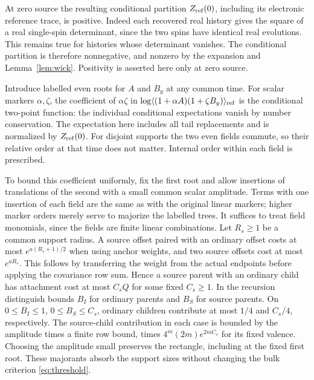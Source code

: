\documentclass[11pt]{article}
\begin{document}
At zero source the resulting conditional partition $Z_{\rm ref}(0)$, including its electronic reference trace, is positive. Indeed each recovered real history gives the square of a real single-spin determinant, since the two spins have identical real evolutions. This remains true for histories whose determinant vanishes. The conditional partition is therefore nonnegative, and nonzero by the expansion and Lemma~\ref{lem:wick}. Positivity is asserted here only at zero source.

Introduce labelled even roots for $A$ and $B_y$ at any common time. For scalar markers $\alpha,\zeta$, the coefficient of $\alpha\zeta$ in $\log\langle(1+\alpha A)(1+\zeta B_y)\rangle_{\rm ref}$ is the conditional two-point function: the individual conditional expectations vanish by number conservation. The expectation here includes all tail replacements and is normalized by $Z_{\rm ref}(0)$. For disjoint supports the two even fields commute, so their relative order at that time does not matter. Internal order within each field is prescribed.

To bound this coefficient uniformly, fix the first root and allow insertions of translations of the second with a small common scalar amplitude. Terms with one insertion of each field are the same as with the original linear markers; higher marker orders merely serve to majorize the labelled trees. It suffices to treat field monomials, since the fields are finite linear combinations. Let $R_s\ge1$ be a common support radius. A source offset paired with an ordinary offset costs at most $e^{a(R_s+1)/2}$ when using anchor weights, and two source offsets cost at most $e^{aR_s}$. This follows by transferring the weight from the actual endpoints before applying the covariance row sum. Hence a source parent with an ordinary child has attachment cost at most $C_s Q$ for some fixed $C_s\ge1$. In the recursion distinguish bounds $B_I$ for ordinary parents and $B_S$ for source parents. On $0\le B_I\le1$, $0\le B_S\le C_s$, ordinary children contribute at most $1/4$ and $C_s/4$, respectively. The source-child contribution in each case is bounded by the amplitude times a finite row bound, times $4^m(2m)e^{2m C_s}$ for its fixed valence. Choosing the amplitude small preserves the rectangle, including at the fixed first root. These majorants absorb the support sizes without changing the bulk criterion \eqref{eq:threshold}.
\end{document}
